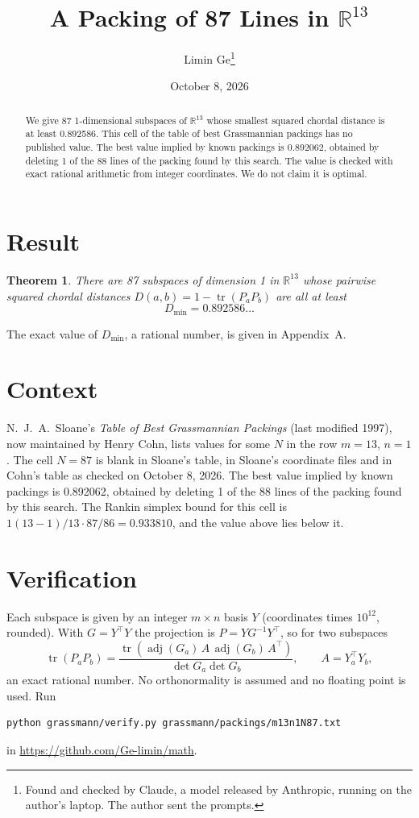 \documentclass[11pt,a4paper]{article}
\title{A Packing of 87 Lines in $\mathbb{R}^{13}$}
\author{Limin Ge\thanks{Found and checked by Claude, a model released by Anthropic, running on the author's laptop. The author sent the prompts.}}
\date{October 8, 2026}
\newtheorem*{theorem}{Theorem}
\begin{document}
\maketitle
\begin{abstract}
We give 87 1-dimensional subspaces of $\mathbb{R}^{13}$ whose smallest squared chordal distance is at least 0.892586. This cell of the table of best Grassmannian packings has no published value. The best value implied by known packings is 0.892062, obtained by deleting 1 of the 88 lines of the packing found by this search. The value is checked with exact rational arithmetic from integer coordinates. We do not claim it is optimal.
\end{abstract}

\section{Result}
\begin{theorem}
There are 87 subspaces of dimension 1 in $\mathbb{R}^{13}$ whose pairwise squared chordal distances $D(a,b) = 1 - \operatorname{tr}(P_aP_b)$ are all at least
\[ D_{\min} = 0.892586\ldots \]
\end{theorem}
The exact value of $D_{\min}$, a rational number, is given in Appendix~A.


\section{Context}
N.~J.~A.~Sloane's \emph{Table of Best Grassmannian Packings} (last modified 1997), now maintained by Henry Cohn, lists values for some $N$ in the row $m=13$, $n=1$. The cell $N=87$ is blank in Sloane's table, in Sloane's coordinate files and in Cohn's table as checked on October 8, 2026. The best value implied by known packings is 0.892062, obtained by deleting 1 of the 88 lines of the packing found by this search. The Rankin simplex bound for this cell is $1(13-1)/13\cdot 87/86 = 0.933810$, and the value above lies below it.


\section{Verification}
Each subspace is given by an integer $m\times n$ basis $Y$ (coordinates times $10^{12}$, rounded). With $G=Y^\top Y$ the projection is $P=YG^{-1}Y^\top$, so for two subspaces
\[ \operatorname{tr}(P_aP_b)=\frac{\operatorname{tr}(\operatorname{adj}(G_a)\,A\,\operatorname{adj}(G_b)\,A^\top)}{\det G_a\det G_b},\qquad A=Y_a^\top Y_b, \]
an exact rational number. No orthonormality is assumed and no floating point is used. Run
\begin{verbatim}
python grassmann/verify.py grassmann/packings/m13n1N87.txt
\end{verbatim}
in \url{https://github.com/Ge-limin/math}.
\end{document}
